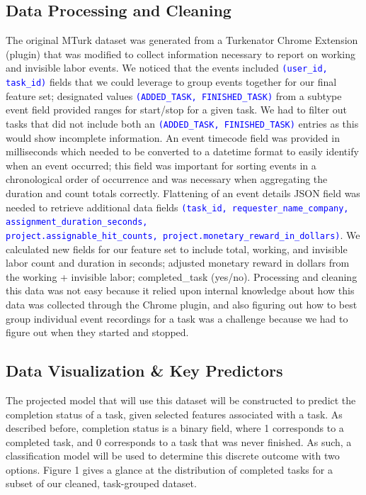 \documentclass[11pt]{article}
\newcommand{\codeword}[1]{\texttt{\textcolor{blue}{#1}}}
\begin{document}
\subsection{Data Processing and Cleaning}
The original MTurk dataset was generated from a Turkenator Chrome Extension (plugin) that was modified to collect information necessary to report on working and invisible labor events. We noticed that the events included \codeword{(user\_id, task\_id)} fields that we could leverage to group events together for our final feature set; designated values \codeword{(ADDED\_TASK, FINISHED\_TASK)} from a subtype event field provided ranges for start/stop for a given task. We had to filter out tasks that did not include both an \codeword{(ADDED\_TASK, FINISHED\_TASK)} entries as this would show incomplete information. An event timecode field was provided in milliseconds which needed to be converted to a datetime format to easily identify when an event occurred; this field was important for sorting events in a chronological order of occurrence and was necessary when aggregating the duration and count totals correctly. Flattening of an event details JSON field was needed to retrieve additional data fields \codeword{(task\_id, requester\_name\_company, assignment\_duration\_seconds, \\project.assignable\_hit\_counts, project.monetary\_reward\_in\_dollars)}. We calculated new fields for our feature set to include total, working, and invisible labor count and duration in seconds; adjusted monetary reward in dollars from the working + invisible labor; completed\_task (yes/no). Processing and cleaning this data was not easy because it relied upon internal knowledge about how this data was collected through the Chrome plugin, and also figuring out how to best group individual event recordings for a task was a challenge because we had to figure out when they started and stopped.

%

\subsection{Data Visualization \& Key Predictors}
The projected model that will use this dataset will be constructed to predict the completion status of a task, given selected features associated with a task. As described before, completion status is a binary field, where 1 corresponds to a completed task, and 0 corresponds to a task that was never finished. As such, a classification model will be used to determine this discrete outcome with two options. Figure 1 gives a glance at the distribution of completed tasks for a subset of our cleaned, task-grouped dataset.
\end{document}

